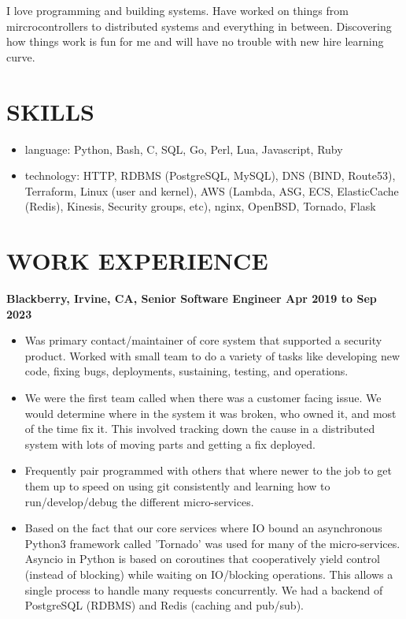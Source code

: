 \documentclass{res}
\begin{document}
\address{john@jjdev.com - (714) 895 6311 - Westminster, CA 92683}

\begin{resume}
I love programming and building systems. Have worked on things
from mircrocontrollers to distributed systems and everything in
between. Discovering how things work is fun for me and will have no
trouble with new hire learning curve.
  \section{SKILLS}
  \begin{itemize}
  \item
    language: Python, Bash, C, SQL, Go, Perl, Lua, Javascript, Ruby

  \item
      technology: HTTP, RDBMS (PostgreSQL, MySQL), DNS (BIND, Route53), Terraform, Linux (user and kernel), AWS (Lambda, ASG, ECS, ElasticCache (Redis), Kinesis, Security groups, etc), nginx, OpenBSD, Tornado, Flask 
  \end{itemize}

  \section{WORK EXPERIENCE}
  {\large \bf Blackberry, Irvine, CA, Senior Software Engineer \hfill Apr 2019 to Sep 2023}
  \begin{itemize}
  \item
    Was primary contact/maintainer of core system that supported a
    security product.  Worked with small team to do a variety of tasks
    like developing new code, fixing bugs, deployments, sustaining,
    testing, and operations.
  \item
    We were the first team called when there was a customer facing
    issue. We would determine where in the system it was broken, who
    owned it, and most of the time fix it.  This involved tracking down
    the cause in a distributed system with lots of moving parts and
    getting a fix deployed.
  \item
    Frequently pair programmed with others that where newer to the job
    to get them up to speed on using git consistently and learning how
    to run/develop/debug the different micro-services.
  \item
Based on the fact that our core services where IO bound
an asynchronous Python3 framework called 'Tornado' was used for many
of the micro-services. Asyncio in Python is based on coroutines that
cooperatively yield control (instead of blocking) while waiting on
IO/blocking operations. This allows a single process to handle many
requests concurrently.  We had a backend of PostgreSQL (RDBMS) and Redis
(caching and pub/sub).


\end{itemize}
\end{resume}
\end{document}
